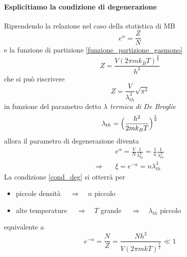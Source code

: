 \paragraph{Esplicitiamo la condizione di degenerazione}
Riprendendo la relazione nel caso della statistica di MB
\begin{equation}
e^{\alpha} = \frac{Z}{N}
\end{equation}
e la funzione di partizione \ref{funzione_partizione_gasmono}
\begin{equation}
Z = \frac{V (2\pi m k_B T)^{ \frac{3}{2} }}{h^3}
\end{equation}
che si può riscrivere 
\begin{equation}
Z = \frac{V}{\lambda_{th}^3} \sqrt{\pi^3}
\end{equation}
in funzione del parametro detto \textit{$\lambda$ termica di De Broglie}
\begin{equation}
\lambda_{th} = \Bigl(  \frac{h^2}{2 m k_B T}  \Bigr)^{ \frac{1}{2} }
\label{lambda_th_debroglie}
\end{equation}
allora il parametro di degenerazione diventa
\begin{equation}
\begin{split}
& e^{\alpha} = \frac{V}{N} \frac{1}{\lambda_{th}^3} = \frac{1}{n} \frac{1}{\lambda_{th}^3} \\
\Rightarrow\quad & \xi = e^{-\alpha} = n \lambda_{th}^3
\end{split}
\end{equation}
La condizione \ref{cond_deg} si otterrà per
\begin{itemize}
\item piccole densità $\quad\Rightarrow\quad n$ piccolo 
\item alte temperature $\quad\Rightarrow\quad T$ grande $\quad\Rightarrow\quad \lambda_{th}$ piccolo
\end{itemize}
equivalente a
\begin{equation}
e^{-\alpha} = \frac{N}{Z} =  \frac{N h^3}{V (2 \pi m k T)^{\frac{3}{2}}} \ll 1
\end{equation}

